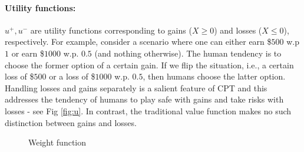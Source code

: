 \documentclass[11pt,letterpaper,english]{article}
\begin{document}
\paragraph{Utility functions:} $u^+, u^-$ are utility functions corresponding to gains ($X \ge 0$) and losses ($X \le 0$), respectively. For example, consider a scenario where one can either earn \$$500$ w.p $1$ or earn \$$1000$ w.p. $0.5$ (and nothing otherwise). The human tendency is to choose the former option of a certain gain. If we flip the situation, i.e., a certain loss of \$$500$ or a loss of \$$1000$ w.p. $0.5$, then humans choose the latter option.  Handling losses and gains separately is a salient feature of CPT and this addresses the tendency of humans to play safe with gains and take risks with losses - see Fig \ref{fig:u}.  In contrast, the traditional value function makes no such distinction between gains and losses.  

\begin{figure}[h]
\centering
{}
\caption{Weight function}
\label{fig:w}
\end{figure}
\end{document}
